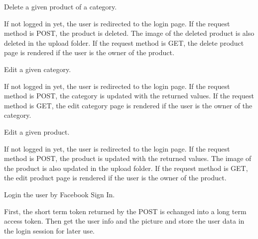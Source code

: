 \documentclass[letterpaper,10pt,english]{sphinxmanual}
\begin{document}

\begin{fulllineitems}
\label{application:application.deleteProduct}
Delete a given product of a category.

If not logged in yet, the user is redirected to
the login page.
If the request method is POST, the product is deleted.
The image of the deleted product is also deleted in the
upload folder.
If the request method is GET, the delete product page is
rendered if the user is the owner of the product.

\end{fulllineitems}


\begin{fulllineitems}
\label{application:application.editCategory}
Edit a given category.

If not logged in yet, the user is redirected to
the login page.
If the request method is POST, the category is updated
with the returned values.
If the request method is GET, the edit category page is
rendered if the user is the owner of the category.

\end{fulllineitems}


\begin{fulllineitems}
\label{application:application.editProduct}
Edit a given product.

If not logged in yet, the user is redirected to
the login page.
If the request method is POST, the product is updated with
the returned values. The image of the product is also updated
in the upload folder.
If the request method is GET, the edit product page is
rendered if the user is the owner of the product.

\end{fulllineitems}


\begin{fulllineitems}
\label{application:application.fbconnect}
Login the user by Facebook Sign In.

First, the short term token returned by the POST is echanged into
a long term access token. Then get the user info and the picture
and store the user data in the login session for later use.

\end{fulllineitems}
\end{document}
